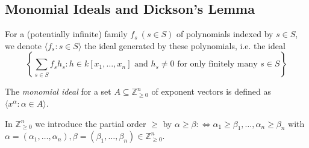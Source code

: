 \subsection{Monomial Ideals and Dickson's Lemma}

\begin{definition}[title = Definition 2.3.1]
    For a (potentially infinite) family $f_s \ (s \in S)$ of polynomials indexed by $s \in S$, we denote $\langle f_s: s\in S \rangle$ the ideal generated by these polynomials, 
    i.e. the ideal 
    \[
      \left\{ \sum_{s\in S} f_sh_s: h \in k[x_1, \dots, x_n] \text{ and } h_s \neq 0 \text{ for only finitely many } s \in S \right\} 
    \]
\end{definition}

\begin{definition}[title = Definition 2.3.2]
    The \textit{monomial ideal} for a set $A \subseteq \mathbb{Z}^n_{\geq 0}$ of exponent vectors is defined as $\langle x^{\alpha}: \alpha \in A \rangle$.
\end{definition} 

\begin{definition}[title = Definition 2.3.3]
    In $\mathbb{Z}^n_{\geq 0}$ we introduce the partial order $\geq$ by $\alpha \geq \beta :\Leftrightarrow \alpha_1 \geq \beta_1, \ldots, \alpha_n \geq \beta_n$ 
    with $\alpha = (\alpha_1, \ldots, \alpha_n), \beta = (\beta_1, \ldots, \beta_n) \in \mathbb{Z}^n_{\geq 0}$.
\end{definition} 

